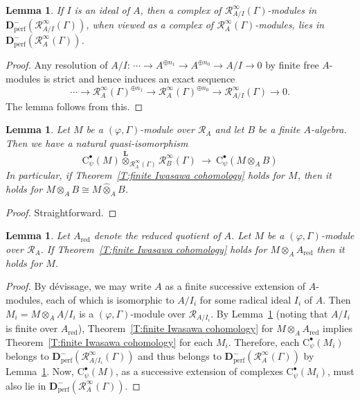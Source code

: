 \documentclass[12pt]{article}
\newtheorem{lemma}[theorem]{Lemma}
\theoremstyle{definition}
\numberwithin{equation}{theorem}
\newcommand{\calR}{\mathcal{R}}
\newcommand{\bbD}{\mathbf{D}}
\newcommand{\bbL}{\mathbf{L}}
\newcommand{\rmC}{\mathrm{C}}
\newcommand{\perf}{\mathrm{perf}}
\newcommand{\red}{\mathrm{red}}
\begin{document}
\begin{lemma}
\label{L:R_A/I(Gamma) is perfect}
If $I$ is an ideal of $A$, then a complex of $\calR^\infty_{A/I}(\Gamma)$-modules in $\bbD_\perf^-(\calR^\infty_{A/I}(\Gamma))$, when viewed as a complex of $\calR^\infty_A(\Gamma)$-modules, lies in $\bbD_\perf^-(\calR^\infty_A(\Gamma))$.
\end{lemma}
\begin{proof}
Any resolution of $A/I$: $\cdots \to A^{\oplus n_1} \to A^{\oplus n_0} \to A/I \to 0$ by finite free $A$-modules  is strict and hence induces an exact sequence
\[
\cdots \to \calR^\infty_A(\Gamma)^{\oplus n_1} \to \calR^\infty_A(\Gamma)^{\oplus n_0} \to \calR^\infty_{A/I}(\Gamma) \to 0.
\]
The lemma follows from this.
\end{proof}



\begin{lemma}
\label{L:finite base change}
Let $M$ be a $(\varphi, \Gamma)$-module over $\calR_A$ and let $B$ be a \emph{finite} $A$-algebra.  Then we have a natural quasi-isomorphism 
\begin{equation}
\label{E:finite base change}
\rmC^\bullet_\psi(M) \stackrel{\bbL}\otimes_{\calR_A^\infty(\Gamma)} \calR_B^\infty(\Gamma) \ \longrightarrow\ \rmC^\bullet_\psi( M  \otimes_A B)
\end{equation}
In particular, if Theorem~\ref{T:finite Iwasawa cohomology} holds for $M$, then it holds for $M  \otimes_A B \cong M\widehat \otimes_A B$.
\end{lemma}
\begin{proof}
Straightforward.
\end{proof}


\begin{lemma}
\label{L:reduced}
Let $A_\red$ denote the reduced quotient of  $A$.
Let $M$ be a $(\varphi,\Gamma)$-module over $\calR_A$.  If
Theorem~\ref{T:finite Iwasawa cohomology} holds for $M \otimes_A A_\red$ then it
holds for $M$.
\end{lemma}
\begin{proof}
By d\'evissage, we may write $A$ as a finite successive extension of $A$-modules, each of which is isomorphic to $A /I_i$ for some radical ideal $I_i$ of $A$.  Then $M_i = M \otimes_A A/I_i$ is a $(\varphi, \Gamma)$-module over $\calR_{A/I_i}$.  By
Lemma~\ref{L:finite base change} (noting that $A/I_i$ is finite over $A_\red$), Theorem~\ref{T:finite Iwasawa cohomology} for $M \otimes_A A_\red$ implies Theorem~\ref{T:finite Iwasawa cohomology} for each $M_i$.  Therefore, each $\rmC^\bullet_\psi(M_i)$ belongs to $\bbD_\perf^-(\calR^\infty_{A/I_i}(\Gamma))$ and thus belongs to $\bbD_\perf^-(\calR^\infty_A(\Gamma))$ by Lemma~\ref{L:R_A/I(Gamma) is perfect}.  Now, $\rmC^\bullet_\psi(M)$, as a successive extension of complexes $\rmC^\bullet_\psi(M_i)$, must also lie in $\bbD_\perf^- (\calR^\infty_A(\Gamma))$.
\end{proof}
\end{document}
